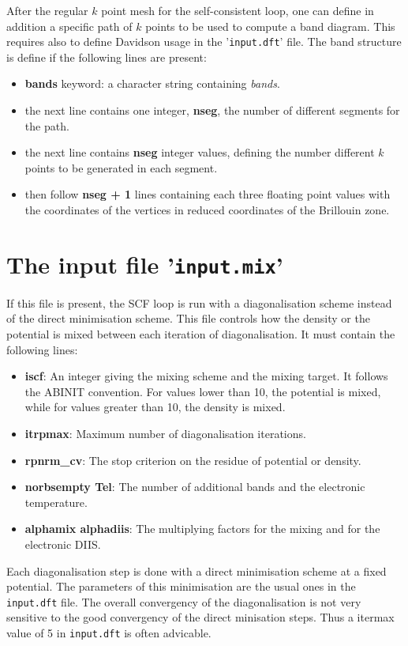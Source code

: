 \documentclass[a4paper,11pt]{report}
\begin{document}
After the regular $k$ point mesh for the self-consistent loop, one can
define in addition a specific path of $k$ points to be used to compute
a band diagram. This requires also to define Davidson usage in the
'\texttt{input.dft}' file. The band structure is define if the following lines
are present:
\begin{itemize}
  \item \textbf{bands} keyword: a character string containing
\emph{bands}.
  \item the next line contains one integer, \textbf{nseg}, the number
of different segments for the path.
  \item the next line contains \textbf{nseg} integer values, defining
the number different $k$ points to be generated in each segment.
  \item then follow \textbf{nseg + 1} lines containing each three floating
point values with the coordinates of the vertices in reduced
coordinates of the Brillouin zone.
\end{itemize}

\section{The input file '\texttt{input.mix}'}
If this file is present, the SCF loop is run with a diagonalisation scheme instead of the direct minimisation scheme. This file controls how the density or the potential is mixed between each iteration of diagonalisation. It must contain the following lines:
\begin{itemize}
  \item \textbf{iscf}: An integer giving the mixing scheme and the mixing target. It follows the ABINIT convention. For values lower than 10, the potential is mixed, while for values greater than 10, the density is mixed.
  \item \textbf{itrpmax}: Maximum number of diagonalisation iterations.
  \item \textbf{rpnrm\_cv}: The stop criterion on the residue of potential or density.
  \item \textbf{norbsempty Tel}: The number of additional bands and the electronic temperature.
  \item \textbf{alphamix alphadiis}: The multiplying factors for the mixing and for the electronic DIIS.
\end{itemize}

Each diagonalisation step is done with a direct minimisation scheme at a fixed potential. The parameters of this minimisation are the usual ones in the \texttt{input.dft} file. The overall convergency of the diagonalisation is not very sensitive to the good convergency of the direct minisation steps. Thus a itermax value of 5 in \texttt{input.dft} is often advicable.
\end{document}
